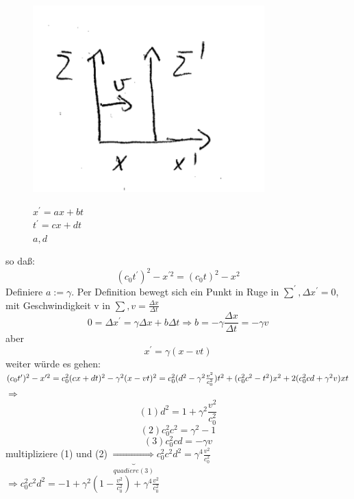 \documentclass[11pt]{article}
\begin{document}
					\begin{figure}[htbp]
						\begin{minipage}[t]{10cm}
							\vspace{0pt}
							\centering
							\includegraphics[scale=0.5]{Lichtgeschwindigkeit2.png}
						\end{minipage}
						\hfill
						\begin{minipage}[t]{10cm}
							\vspace{0pt}
							$x^\prime = ax + bt$\\
							$t^\prime = cx + dt $\\
							$ a,d  $
						\end{minipage}
					\end{figure}
					so daß:
					\[ (c_0 t^\prime)^2 - x^{\prime2} = (c_0 t)^2 -x^2 \]
					Definiere $ a:= \gamma$. Per Definition bewegt sich ein Punkt in Ruge in $\sum^\prime, \Delta x^\prime = 0 $, mit Geschwindigkeit v in $\sum , v = \frac{\Delta x}{\Delta t}$
					\[ 0 = \Delta x^\prime = \gamma \Delta x + b \Delta t \Rightarrow b = - \gamma \frac{\Delta x}{\Delta t} = - \gamma v \]  aber \[ x^\prime = \gamma(x - vt) \]
					weiter würde es gehen:\\
					$ (c_0t^\prime)^2 - x^{\prime2} = c_0^2(cx + dt)^2 - \gamma^2(x -vt)^2 \\
						= c_0^2(d^2 - \gamma^2 \frac{v^2}{c_0^2}) t^2 + (c_0^2 c^2 - t^2) x^2 + 2(c_0^2 cd + \gamma^2 v)x t $\\
						$\Rightarrow$
						\[ (1) d^2 = 1 + \gamma^2 \frac{v^2}{c_0^2} \]
						\[ (2) c_0^2 c^2 = \gamma^2 - 1 \]
						\[ (3) c_0^2 cd = -\gamma v \]
						multipliziere (1) und (2) \qquad $\underbrace{\Rightarrow}_{quadiere (3)} c_0^2 c^2 d^2 = \gamma^4 \frac{v^2}{c_0^2}$
						$\Rightarrow c_0^2 c^2 d^2 = - 1 + \gamma^2 (1 - \frac{v^2}{c_0^2}) + \gamma^4 \frac{v^2}{c_0^2} $\\
\end{document}
